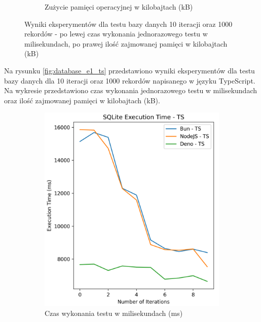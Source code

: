\begin{figure}[H]
\begin{subfigure}[b]{0.4\textwidth}
    \caption{Zużycie pamięci operacyjnej w kilobajtach (kB)}
    \label{fig:database_e1_js_memory}
  \end{subfigure}
  \caption{Wyniki eksperymentów dla testu bazy danych 10 iteracji oraz 1000 rekordów - po lewej czas wykonania jednorazowego testu w milisekundach, po prawej ilość zajmowanej pamięci w kilobajtach (kB)}
  \label{fig:database_e1_js}
\end{figure}

Na rysunku \ref{fig:database_e1_ts} przedstawiono wyniki eksperymentów dla testu bazy danych dla 10 iteracji oraz 1000 rekordów napisanego w języku TypeScript. Na wykresie przedstawiono czas wykonania jednorazowego testu w milisekundach oraz ilość zajmowanej pamięci w kilobajtach (kB).

\begin{figure}[H]
  \centering
  \begin{subfigure}[b]{0.4\textwidth}
    \centering
    \includegraphics[width=\textwidth]{Figures/database/sqlite_10_1000_ts_time.png}
    \caption{Czas wykonania testu w milisekundach (ms)}
    \label{fig:database_e1_ts_time}
  \end{subfigure}
  \begin{subfigure}[b]{0.4\textwidth}

\end{subfigure}
\end{figure}
